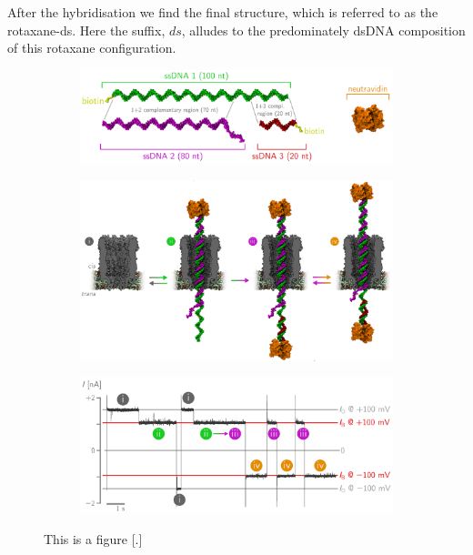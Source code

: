 After the hybridisation we find the final structure, which is referred to as the
rotaxane-ds. Here the suffix, $ds$, alludes to the predominately dsDNA composition of
this rotaxane configuration.\\


\begin{figure}[ht!]
  \begin{centering}
  \begin{subfigure}[t]{\dimexpr.92\linewidth-1.3em\relax}
  \centering
  \includegraphics[width=\linewidth,valign=t]{Figures/RConstruction1.png}
  \end{subfigure}%
  \vspace{0.5cm}
  \begin{subfigure}[t]{\dimexpr.92\linewidth-1.3em\relax}
  \centering
  \includegraphics[width=\linewidth,valign=t]{Figures/RConstruction2.png}
  \end{subfigure}%
  \vspace{0.5cm}
  \begin{subfigure}[t]{\dimexpr.92\linewidth-1.3em\relax}
  \centering
  \includegraphics[width=\linewidth,valign=t]{Figures/RConstruction3.png}
  \end{subfigure}
  \caption{This is a figure [.]}
  \label{fig:test}
  \end{centering}
\end{figure}


\newpage
